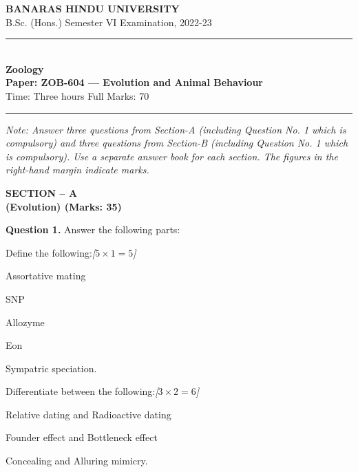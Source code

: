 \documentclass[11pt,a4paper]{article}
\newcommand{\pts}[1]{\hfill   \textit{[#1]}}
\begin{document}
\begin{center}
  {\large\bfseries BANARAS HINDU UNIVERSITY}\\[2pt]
  {\normalsize B.Sc. (Hons.) Semester VI Examination, 2022-23}\\[6pt]
  \rule{0.8\linewidth}{0.5pt}\\[6pt]
  {\large\bfseries Zoology}\\[4pt]
  {\large\bfseries Paper: ZOB-604 --- Evolution and Animal Behaviour}\\[4pt]
  {\normalsize Time: Three hours \hfill Full Marks: 70}
\end{center}

\rule{\linewidth}{0.4pt}

\smallskip



\noindent   \textit{Note: Answer three questions from Section-A (including Question No. 1 which is compulsory) and three questions from Section-B (including Question No. 1 which is compulsory). Use a separate answer book for each section. The figures in the right-hand margin indicate marks.}

\bigskip

\begin{center}
   \textbf{SECTION -- A} \\
   \textbf{(Evolution) (Marks: 35)}
\end{center}




\noindent   \textbf{Question 1.} Answer the following parts:

\begin{parts}
  \item Define the following:\pts{$5  \times 1 = 5$}
  
\begin{parts}
    \item Assortative mating
    \item SNP
    \item Allozyme
    \item Eon
    \item Sympatric speciation.
  \end{parts}
  
  \item Differentiate between the following:\pts{$3  \times 2 = 6$}
  
\begin{parts}
    \item Relative dating and Radioactive dating
    \item Founder effect and Bottleneck effect
    \item Concealing and Alluring mimicry.
  \end{parts}
\end{parts}
\end{document}
